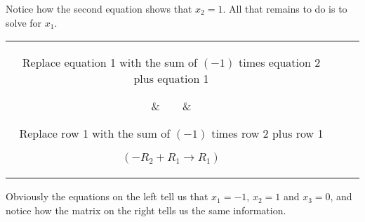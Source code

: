 {Notice how the second equation shows that $x_2 = 1$. All that remains to do is to solve for $x_1$.

\begin{center}
\begin{tabular}{ccc}
\parbox{120pt}{\centering\small Replace equation 1 with the sum of $(-1)$ times equation 2 plus equation 1}
&$\quad \quad$&
\parbox{120pt}{\centering\small Replace row 1 with the sum of $(-1)$ times row 2 plus row 1

$(-R_2+R_1\rightarrow R_1)$}
\\
\\
$\begin{array}{ccccccc}
x_1& &   &&&=&-1\\
   & &x_2&&&=&1\\
   & &   & &x_3&=&0
\end{array}$
&$\quad \quad$&
$\bam{3}
1&0&0&-1\\ 0&1&0&1\\ 0&0&1&0\\
\eam$
\end{tabular}
\end{center}

Obviously the equations on the left tell us that $x_1 = -1$, $x_2 = 1$ and $x_3=0$, and notice how the matrix on the right tells us the same information. }\\




